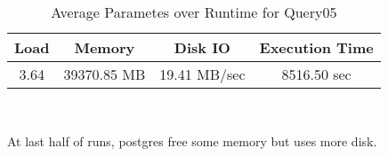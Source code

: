 \documentclass[../../main.tex]{subfiles}
\begin{document}
\begin{minipage}{.5\textwidth}
    \end{minipage}
    \begin{table}
        \begin{center}
            \begin{tabular}{ |c|c|c|c| } 
            \hline
            Load & Memory & Disk IO & Execution Time\\
            \hline
            3.64 & 39370.85 MB & 19.41 MB/sec & 8516.50 sec \\
            \hline
            \end{tabular}
            \\[1pt]
            \caption{Average Parametes over Runtime for Query05}
        \end{center}
    \end{table}
    At last half of runs, postgres free some memory but uses more disk.
    \pagebreak
\end{document}
